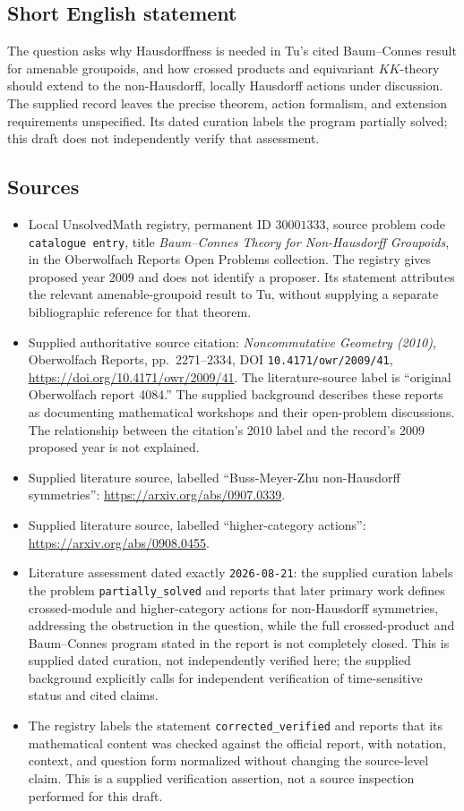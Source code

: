 \documentclass[11pt]{article}
\begin{document}
\subsection{Short English statement}
The question asks why Hausdorffness is needed in Tu's cited Baum--Connes result for amenable groupoids, and how crossed products and equivariant \(KK\)-theory should extend to the non-Hausdorff, locally Hausdorff actions under discussion. The supplied record leaves the precise theorem, action formalism, and extension requirements unspecified. Its dated curation labels the program partially solved; this draft does not independently verify that assessment.
\subsection{Sources}
\begin{itemize}
\item Local UnsolvedMath registry, permanent ID \(30001333\), source problem code \texttt{catalogue entry}, title \emph{Baum--Connes Theory for Non-Hausdorff Groupoids}, in the Oberwolfach Reports Open Problems collection. The registry gives proposed year 2009 and does not identify a proposer. Its statement attributes the relevant amenable-groupoid result to Tu, without supplying a separate bibliographic reference for that theorem.
\item Supplied authoritative source citation: \emph{Noncommutative Geometry (2010)}, Oberwolfach Reports, pp.\ 2271--2334, DOI \texttt{10.4171/owr/2009/41}, \url{https://doi.org/10.4171/owr/2009/41}. The literature-source label is ``original Oberwolfach report 4084.'' The supplied background describes these reports as documenting mathematical workshops and their open-problem discussions. The relationship between the citation's 2010 label and the record's 2009 proposed year is not explained.
\item Supplied literature source, labelled ``Buss-Meyer-Zhu non-Hausdorff symmetries'': \url{https://arxiv.org/abs/0907.0339}.
\item Supplied literature source, labelled ``higher-category actions'': \url{https://arxiv.org/abs/0908.0455}.
\item Literature assessment dated exactly \texttt{2026-08-21}: the supplied curation labels the problem \texttt{partially\_solved} and reports that later primary work defines crossed-module and higher-category actions for non-Hausdorff symmetries, addressing the obstruction in the question, while the full crossed-product and Baum--Connes program stated in the report is not completely closed. This is supplied dated curation, not independently verified here; the supplied background explicitly calls for independent verification of time-sensitive status and cited claims.
\item The registry labels the statement \texttt{corrected\_verified} and reports that its mathematical content was checked against the official report, with notation, context, and question form normalized without changing the source-level claim. This is a supplied verification assertion, not a source inspection performed for this draft.
\end{itemize}
\end{document}
